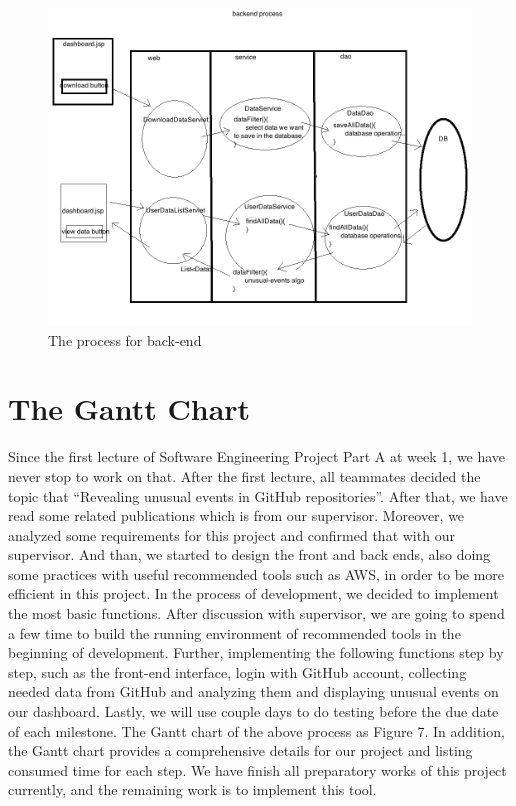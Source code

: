 \documentclass[conference]{IEEEtran}
\begin{document}
\begin{figure}[!ht]
\centering
\includegraphics[scale=0.25]{back-end_process}
\caption{The process for back-end}
\end{figure}


\section{The Gantt Chart}
Since the first lecture of Software Engineering Project Part A at week 1, we have never stop to work on that. After the first lecture, all teammates decided the topic that “Revealing unusual events in GitHub repositories”. After that, we have read some related publications which is from our supervisor. Moreover, we analyzed some requirements for this project and confirmed that with our supervisor. And than, we started to design the front and back ends, also doing some practices with useful recommended tools such as AWS, in order to be more efficient in this project. In the process of development, we decided to implement the most basic functions. After discussion with supervisor, we are going to spend a few time to build the running environment of recommended tools in the beginning of development. Further, implementing the following functions step by step, such as the front-end interface, login with GitHub account, collecting needed data from GitHub and analyzing them and displaying unusual events on our dashboard. Lastly, we will use couple days to do testing before the due date of each milestone. The Gantt chart of the above process as Figure 7. In addition, the Gantt chart provides a comprehensive details for our project and listing consumed time for each step. We have finish all preparatory works of this project currently, and the remaining work is to implement this tool.
\end{document}
